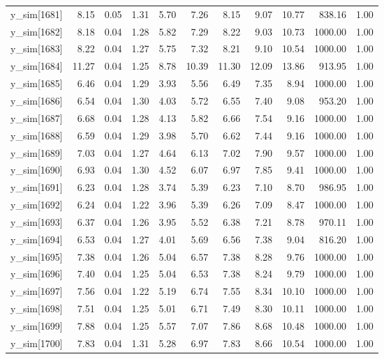 \begin{table}[ht]
\begin{tabular}{rrrrrrrrrrr}
  y\_sim[1681] & 8.15 & 0.05 & 1.31 & 5.70 & 7.26 & 8.15 & 9.07 & 10.77 & 838.16 & 1.00 \\ 
  y\_sim[1682] & 8.18 & 0.04 & 1.28 & 5.82 & 7.29 & 8.22 & 9.03 & 10.73 & 1000.00 & 1.00 \\ 
  y\_sim[1683] & 8.22 & 0.04 & 1.27 & 5.75 & 7.32 & 8.21 & 9.10 & 10.54 & 1000.00 & 1.00 \\ 
  y\_sim[1684] & 11.27 & 0.04 & 1.25 & 8.78 & 10.39 & 11.30 & 12.09 & 13.86 & 913.95 & 1.00 \\ 
  y\_sim[1685] & 6.46 & 0.04 & 1.29 & 3.93 & 5.56 & 6.49 & 7.35 & 8.94 & 1000.00 & 1.00 \\ 
  y\_sim[1686] & 6.54 & 0.04 & 1.30 & 4.03 & 5.72 & 6.55 & 7.40 & 9.08 & 953.20 & 1.00 \\ 
  y\_sim[1687] & 6.68 & 0.04 & 1.28 & 4.13 & 5.82 & 6.66 & 7.54 & 9.16 & 1000.00 & 1.00 \\ 
  y\_sim[1688] & 6.59 & 0.04 & 1.29 & 3.98 & 5.70 & 6.62 & 7.44 & 9.16 & 1000.00 & 1.00 \\ 
  y\_sim[1689] & 7.03 & 0.04 & 1.27 & 4.64 & 6.13 & 7.02 & 7.90 & 9.57 & 1000.00 & 1.00 \\ 
  y\_sim[1690] & 6.93 & 0.04 & 1.30 & 4.52 & 6.07 & 6.97 & 7.85 & 9.41 & 1000.00 & 1.00 \\ 
  y\_sim[1691] & 6.23 & 0.04 & 1.28 & 3.74 & 5.39 & 6.23 & 7.10 & 8.70 & 986.95 & 1.00 \\ 
  y\_sim[1692] & 6.24 & 0.04 & 1.22 & 3.96 & 5.39 & 6.26 & 7.09 & 8.47 & 1000.00 & 1.00 \\ 
  y\_sim[1693] & 6.37 & 0.04 & 1.26 & 3.95 & 5.52 & 6.38 & 7.21 & 8.78 & 970.11 & 1.00 \\ 
  y\_sim[1694] & 6.53 & 0.04 & 1.27 & 4.01 & 5.69 & 6.56 & 7.38 & 9.04 & 816.20 & 1.00 \\ 
  y\_sim[1695] & 7.38 & 0.04 & 1.26 & 5.04 & 6.57 & 7.38 & 8.28 & 9.76 & 1000.00 & 1.00 \\ 
  y\_sim[1696] & 7.40 & 0.04 & 1.25 & 5.04 & 6.53 & 7.38 & 8.24 & 9.79 & 1000.00 & 1.00 \\ 
  y\_sim[1697] & 7.56 & 0.04 & 1.22 & 5.19 & 6.74 & 7.55 & 8.34 & 10.10 & 1000.00 & 1.00 \\ 
  y\_sim[1698] & 7.51 & 0.04 & 1.25 & 5.01 & 6.71 & 7.49 & 8.30 & 10.11 & 1000.00 & 1.00 \\ 
  y\_sim[1699] & 7.88 & 0.04 & 1.25 & 5.57 & 7.07 & 7.86 & 8.68 & 10.48 & 1000.00 & 1.00 \\ 
  y\_sim[1700] & 7.83 & 0.04 & 1.31 & 5.28 & 6.97 & 7.83 & 8.66 & 10.54 & 1000.00 & 1.00 \\ 

\end{tabular}
\end{table}
